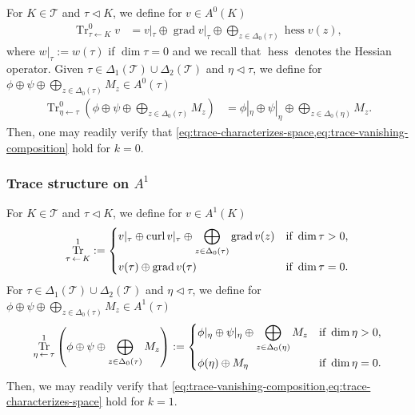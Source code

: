 \documentclass{mcom-l}
\theoremstyle{definition}
\theoremstyle{remark}
\numberwithin{equation}{section}
\DeclareMathOperator{\curl}{curl}
\DeclareMathOperator{\grad}{grad}
\DeclareMathOperator{\hess}{hess}
\DeclareMathOperator{\from}{\leftarrow}
\DeclareMathOperator{\Tr}{Tr}
\DeclareMathOperator{\strictsubsimplex}{\lhd}
\newcommand{\mesh}[0]{\mathcal{T}}
\begin{document}
For $K \in \mesh$ and $\tau \strictsubsimplex K$, we define for $v \in A^0(K)$
\begin{align*}
	\Tr^0_{\tau \from K} v &= v|_{\tau} \oplus \grad v|_{\tau} 
	\oplus \bigoplus_{z \in \Delta_0(\tau)} \hess v(z),
\end{align*}
where $w|_{\tau} := w(\tau)$ if $\dim \tau = 0$ and we recall that 
$\hess$ denotes the Hessian operator.
Given $\tau \in \Delta_{1}(\mesh) \cup \Delta_{2}(\mesh)$ 
and $\eta \strictsubsimplex \tau$, we define for $\phi \oplus \psi 
\oplus \bigoplus_{z \in \Delta_0(\tau)} M_z \in A^0(\tau)$
\begin{align*}
	\Tr^0_{\eta \from \tau} \left( \phi \oplus \psi
	\oplus \bigoplus_{z \in \Delta_0(\tau)} M_z \right)
	&= \phi|_{\eta} \oplus \psi|_{\eta}  
	\oplus \bigoplus_{z \in \Delta_0(\eta)} M_z.
\end{align*}
Then, one may readily verify that 
\cref{eq:trace-characterizes-space,eq:trace-vanishing-composition} hold
for $k = 0$.

\subsubsection{Trace structure on $A^1$}

For $K \in \mesh$ and $\tau \strictsubsimplex K$, we define for $v \in A^1(K)$
\begin{align*}
	\Tr^1_{\tau \from K} := \begin{dcases}
		v|_{\tau} \oplus \curl v|_{\tau} 
		\oplus \bigoplus_{z \in \Delta_0(\tau)} \grad v(z)
		& \text{if } \dim \tau > 0, \\
		v(\tau) \oplus \grad v(\tau) & \text{if } \dim \tau = 0.
	\end{dcases}
\end{align*}
For $\tau \in \Delta_1(\mesh) \cup \Delta_2(\mesh)$ and 
$\eta \strictsubsimplex \tau$,
we define for $\phi \oplus \psi \oplus 
\bigoplus_{z \in \Delta_0(\tau)} M_z \in A^1(\tau)$
\begin{align*}
	\Tr^1_{\eta \from \tau} \left( 
	\phi \oplus \psi \oplus 
	\bigoplus_{z \in \Delta_0(\tau)} M_z \right) 
	:= \begin{dcases}
		\phi|_{\eta} \oplus \psi|_{\eta} 
		\oplus \bigoplus_{z \in \Delta_0(\eta)} M_z 
		& \text{if } \dim \eta > 0, \\
		\phi(\eta) \oplus M_{\eta} & \text{if } \dim \eta = 0.
	\end{dcases}
\end{align*}
Then, we may readily verify that 
\cref{eq:trace-vanishing-composition,eq:trace-characterizes-space} hold
for $k = 1$.
\end{document}
